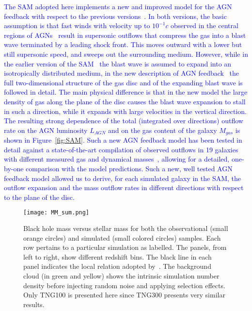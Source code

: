\documentclass[twocolumn]{aastex631}
\newcommand{\ding}[1]{\textcolor{red}{[{\bf Xuheng}: #1]}}
\newcommand{\blue}[1]{\textcolor{blue}{#1}}
\begin{document}
\blue{The SAM adopted here implements a new and improved  model for the AGN feedback with respect to the previous versions~\citep{Menci2008}. In both versions, the basic assumption is that fast winds with velocity up to $10^{-1}c$ observed in the central regions of AGNs~\citep{Chartas2002, Pounds2003}  result in  supersonic outflows that compress the gas into a blast wave terminated by a leading shock front. This  moves outward with a lower but still supersonic speed, and sweeps out the surrounding medium. However, while in the earlier version of the SAM~\citep{Menci2016} the blast wave is assumed to expand into an isotropically distributed medium, in the new description of AGN feedback~\citep{Menci2019} the full two-dimensional structure of the gas disc and of the expanding blast wave is followed in detail. The main physical difference is that in the new model the large density of gas along the plane of the disc causes the blast wave expansion to stall in such a direction, while it expands with large velocities in the vertical direction. The resulting strong dependence of the total (integrated over directions) outflow rate on the AGN luminosity $L_{AGN}$ and on the gas content of the galaxy $M_{gas}$ is shown in Figure~\ref{fig:SAM}. Such a new AGN feedback model has been tested in detail against a state-of-the-art compilation of observed outflows in 19 galaxies with different measured gas and dynamical masses~\citep{Fiore2017},
allowing for a detailed, one-by-one comparison with the model predictions. Such a new, well tested AGN feedback model  allowed us to derive, for each simulated galaxy in the SAM,  the outflow expansion and the mass outflow rates in different directions with respect to the plane of the disc.}



\begin{figure*}
\centering
\texttt{[image: MM\_sum.png]}
\caption{\label{fig:comparsion} 
Black hole mass versus stellar mass for both the observational (small orange circles) and simulated (small colored circles) samples. Each row pertains to a particular simulation as labelled. The panels, from left to right, show different redshift bins. The black line in each panel indicates the local relation adopted by~\citet{Ding2020}. The background cloud (in green and yellow) shows the intrinsic simulation number density before injecting random noise and applying selection effects. Only TNG100 is presented here since TNG300 presents very similar results.
}
\end{figure*} 
\end{document}
